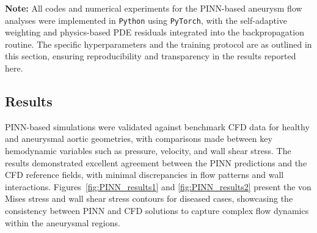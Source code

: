 \documentclass{article}
\begin{document}
\vspace{2em}
\noindent\textbf{Note:} All codes and numerical experiments for the PINN-based aneurysm flow analyses were implemented in \texttt{Python} using \texttt{PyTorch}, with the self-adaptive weighting and physics-based PDE residuals integrated into the backpropagation routine. The specific hyperparameters and the training protocol are as outlined in this section, ensuring reproducibility and transparency in the results reported here.

\subsection{Results}
\label{sec:PINN_Results}

PINN-based simulations were validated against benchmark CFD data for healthy and aneurysmal aortic geometries, with comparisons made between key hemodynamic variables such as pressure, velocity, and wall shear stress. The results demonstrated excellent agreement between the PINN predictions and the CFD reference fields, with minimal discrepancies in flow patterns and wall interactions. Figures~\ref{fig:PINN_results1} and \ref{fig:PINN_results2} present the von Mises stress and wall shear stress contours for diseased cases, showcasing the consistency between PINN and CFD solutions to capture complex flow dynamics within the aneurysmal regions.
\end{document}
